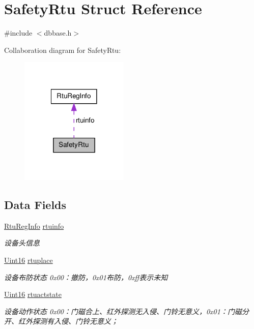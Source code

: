 \hypertarget{structSafetyRtu}{\section{Safety\-Rtu Struct Reference}
\label{structSafetyRtu}
}


{\ttfamily \#include $<$dbbase.\-h$>$}



Collaboration diagram for Safety\-Rtu\-:\nopagebreak
\begin{figure}[H]
\begin{center}
\leavevmode
\includegraphics[width=146pt]{structSafetyRtu__coll__graph}
\end{center}
\end{figure}
\subsection*{Data Fields}
\begin{DoxyCompactItemize}
\item 
\hyperlink{structRtuRegInfo}{Rtu\-Reg\-Info} \hyperlink{structSafetyRtu_a961d9d1c9a8c9082f6cd8bcc8b3292a4}{rtuinfo}
\begin{DoxyCompactList}\small\item\em 设备头信息 \end{DoxyCompactList}\item 
\hyperlink{base_8h_ae9f2e1f80fbd243687a04febbf590e13}{Uint16} \hyperlink{structSafetyRtu_aa857a3b46e71c67a4d9c7bb83e34ffc0}{rtuplace}
\begin{DoxyCompactList}\small\item\em 设备布防状态 0x00：撤防，0x01布防，0xff表示未知 \end{DoxyCompactList}\item 
\hyperlink{base_8h_ae9f2e1f80fbd243687a04febbf590e13}{Uint16} \hyperlink{structSafetyRtu_a43fd8e2a562fea9a6ea5a7fe57fec7af}{rtuactstate}
\begin{DoxyCompactList}\small\item\em 设备动作状态 0x00：门磁合上、红外探测无入侵、门铃无意义，0x01：门磁分开、红外探测有入侵、门铃无意义； \end{DoxyCompactList}\end{DoxyCompactItemize}


